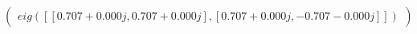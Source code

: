 \documentclass[border=1em]{standalone}
\begin{document}
$
\left(
\begin{array}{cc}
e
i
g
(
[
[
0
.
7
0
7
+
0
.
0
0
0
j
,
 
0
.
7
0
7
+
0
.
0
0
0
j
]
,
[
0
.
7
0
7
+
0
.
0
0
0
j
,
 
-
0
.
7
0
7
-
0
.
0
0
0
j
]
]
)
\end{array}
\right)
$
\end{document}

